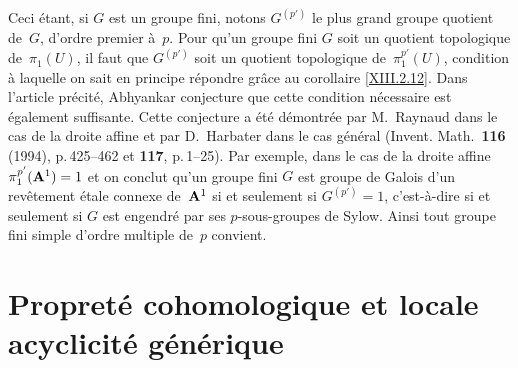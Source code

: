 \begin{remarqueMR}
Ceci \'etant, si $G$ est un groupe fini, notons $G^{(p')}$ le plus grand
groupe quotient de~$G$, d'ordre premier \`a~$p$. Pour qu'un groupe fini
$G$ soit un quotient topologique de~$\pi_1(U)$, il faut que $G^{(p')}$
soit un quotient topologique de~$\pi_1^{p'}(U)$, condition \`a laquelle
on sait en principe r\'epondre gr\^ace au corollaire \ref{XIII.2.12}. Dans l'article
pr\'ecit\'e, Abhyankar conjecture que cette condition n\'ecessaire est
\'egalement suffisante. Cette conjecture a \'et\'e d\'emontr\'ee par M.\, Raynaud
dans le cas de la droite affine et par D.\, Harbater dans le cas g\'en\'eral
(Invent. Math.\ \textbf{116} (1994), p.\,425--462 et \textbf{117}, p.\,1--25). Par exemple,
dans le cas de la droite affine $\pi_1^{p'}(\AA^1)=1$ et on
conclut qu'un groupe fini $G$ est groupe de Galois d'un rev\^etement
\'etale connexe de~$\AA^1$ si et seulement si $G^{(p')} = 1$,
c'est-\`a-dire si et seulement si $G$ est engendr\'e par ses
$p$-sous-groupes de Sylow. Ainsi tout groupe fini simple d'ordre
multiple de~$p$ convient.
\end{remarqueMR}


\section{Propret\'e cohomologique et locale acyclicit\'e g\'en\'erique}
\label{XIII.3}

